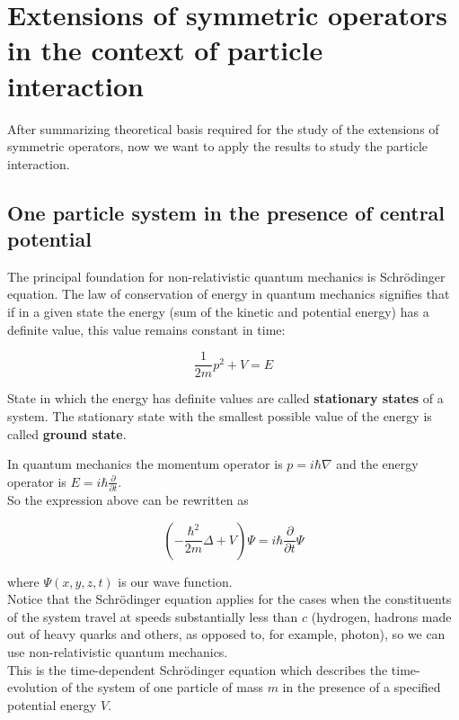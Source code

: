 \documentclass[11pt, a4paper, german]{article}
\theoremstyle{plain}
\theoremstyle{definition}
\theoremstyle{remark}
\numberwithin{equation}{section}
\numberwithin{theorem}{section}
\begin{document}
\section{Extensions of symmetric operators in the context of particle interaction}

After summarizing theoretical basis required for the study of the extensions of symmetric operators, now we want to apply the results to study the particle interaction.

\subsection{One particle system in the presence of central potential}

The principal foundation for non-relativistic quantum mechanics is Schrödinger equation. The law of conservation of energy in quantum mechanics signifies that if in a given state the energy (sum of the kinetic and potential energy) has a definite value, this value remains constant in time:

\begin{equation} \label{eq:energy}
\frac{1}{2m} p^2 + V = E
\end{equation}

State in which the energy has definite values are called \textbf{stationary states} of a system. The stationary state with the smallest possible value of the energy is called \textbf{ground state}.

In quantum mechanics the momentum operator is $p = i\hbar\nabla$ and the energy operator is $E = i\hbar \frac{\partial}{\partial t}$.\\

So the expression above can be rewritten as 

\begin{equation} \label{eq:schroedinger}
\left(- \frac{\hbar^2}{2m}\Delta + V\right)\Psi = i\hbar \frac{\partial}{\partial t} \Psi
\end{equation}

where $\Psi(x,y,z,t)$ is our wave function.\\

Notice that the Schrödinger equation applies for the cases when the constituents of the system travel at speeds substantially less than $c$ (hydrogen, hadrons made out of heavy quarks and others, as opposed to, for example, photon), so we can use non-relativistic quantum mechanics.\\

This is the time-dependent Schrödinger equation which describes the time-evolution of the system of one particle of mass $m$ in the presence of a specified potential energy $V$.\\
\end{document}
